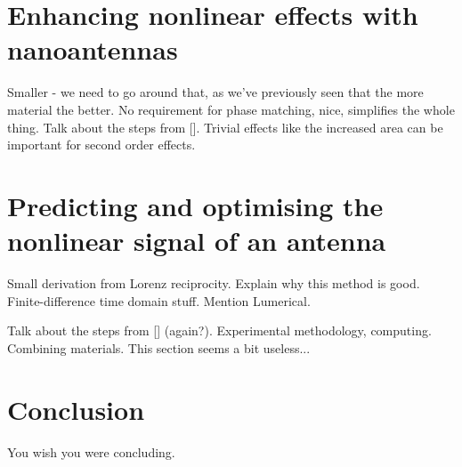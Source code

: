 \documentclass[12pt,a4paper]{article}
\newcommand{\citein}[1]{[\citen{#1}]}
\begin{document}
\section{Enhancing nonlinear effects with nanoantennas}
Smaller - we need to go around that, as we've previously seen that the more material the better. No requirement for phase matching, nice, simplifies the whole thing. Talk about the steps from \citein{koshelevSubwavelengthDielectricResonators2020}. Trivial effects like the increased area can be important for second order effects.

\section{Predicting and optimising the nonlinear signal of an antenna}
Small derivation from Lorenz reciprocity. Explain why this method is good. Finite-difference time domain stuff. Mention Lumerical.

Talk about the steps from \citein{koshelevSubwavelengthDielectricResonators2020} (again?). Experimental methodology, computing. Combining materials. This section seems a bit useless...

\section{Conclusion}
You wish you were concluding\cite{aluTheoryModelingFeatures2013}.



\end{document}
